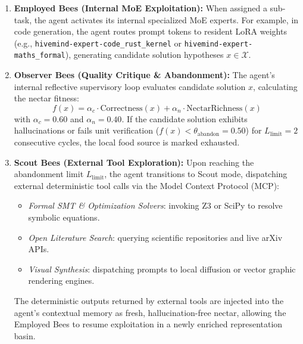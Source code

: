 \documentclass[11pt,a4paper]{article}
\begin{document}
\begin{enumerate}[leftmargin=1.8em]
    \item \textbf{Employed Bees (Internal MoE Exploitation):} When assigned a sub-task, the agent activates its internal specialized MoE experts. For example, in code generation, the agent routes prompt tokens to resident LoRA weights (e.g., \texttt{hivemind-expert-code\_rust\_kernel} or \texttt{hivemind-expert-maths\_formal}), generating candidate solution hypotheses $x \in \mathcal{X}$.
    
    \item \textbf{Observer Bees (Quality Critique \& Abandonment):} The agent's internal reflective supervisory loop evaluates candidate solution $x$, calculating the nectar fitness:
    \begin{equation}
        f(x) = \alpha_c \cdot \text{Correctness}(x) + \alpha_n \cdot \text{NectarRichness}(x)
        \label{eq:fitness_score}
    \end{equation}
    with $\alpha_c = 0.60$ and $\alpha_n = 0.40$. If the candidate solution exhibits hallucinations or fails unit verification ($f(x) < \theta_{\text{abandon}} = 0.50$) for $L_{\text{limit}} = 2$ consecutive cycles, the local food source is marked exhausted.

    \item \textbf{Scout Bees (External Tool Exploration):} Upon reaching the abandonment limit $L_{\text{limit}}$, the agent transitions to Scout mode, dispatching external deterministic tool calls via the Model Context Protocol (MCP):
    \begin{itemize}[leftmargin=1.8em]
        \item \emph{Formal SMT \& Optimization Solvers}: invoking Z3 or SciPy to resolve symbolic equations.
        \item \emph{Open Literature Search}: querying scientific repositories and live arXiv APIs.
        \item \emph{Visual Synthesis}: dispatching prompts to local diffusion or vector graphic rendering engines.
    \end{itemize}
    The deterministic outputs returned by external tools are injected into the agent's contextual memory as fresh, hallucination-free nectar, allowing the Employed Bees to resume exploitation in a newly enriched representation basin.
\end{enumerate}
\end{document}
